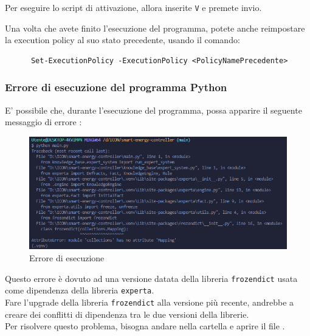 \documentclass[12pt, letterpaper]{article}
\begin{document}
\begin{appendices}
      \noindent Per eseguire lo script di attivazione, allora inserite \texttt{V} e
      premete invio.

      \noindent Una volta che avete finito l'esecuzione del programma, potete anche reimpostare
      la execution policy al suo stato precedente, usando il comando:

      \begin{verbatim}
      Set-ExecutionPolicy -ExecutionPolicy <PolicyNamePrecedente>
\end{verbatim}


      \subsubsection{Errore di esecuzione del programma Python}
      \label{sec:python-error}

      E' possibile che, durante l'esecuzione del programma, possa apparire il seguente
      messaggio di errore \cite{python-mapping-problem}:

      \begin{figure}[h]
            \centering
            \includegraphics[scale=0.55]{errore-python.png}
            \caption{Errore di esecuzione}
      \end{figure}

      \noindent Questo errore è dovuto ad una versione datata della libreria \texttt{frozendict}
      usata come dipendenza della libreria \texttt{experta}. \\

      \noindent Fare l'upgrade della libreria \texttt{frozendict} alla versione più recente, andrebbe a
      creare dei conflitti di dipendenza tra le due versioni della librerie. \\

      \noindent Per risolvere questo problema, bisogna andare nella cartella
       e aprire il file .


\end{appendices}
\end{document}
